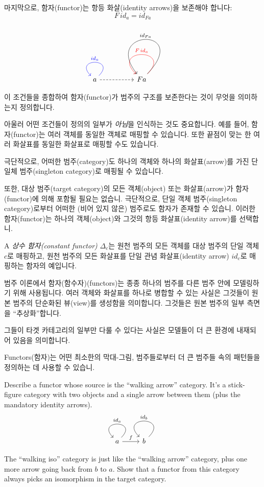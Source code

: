 \documentclass[DaoFP]{subfiles}
\begin{document}
마지막으로, 함자(functor)는 항등 화살(identity arrows)을 보존해야 합니다:
\[ F\, id_a = id_{F a} \]

\[
 \begin{tikzcd}
 a 
  \arrow[loop, blue,  "id_a"']
\arrow[rr, dashed]
 && F a
  \arrow[loop, red, "F \, id_{a}"']
  \arrow[loop, controls={+(2.5, 2.6) and +(-2, 2.5)}, "id_{F a}"']
  \end{tikzcd}
\]

이 조건들을 종합하여 함자(functor)가 범주의 구조를 보존한다는 것이 무엇을 의미하는지 정의합니다.

아울러 어떤 조건들이 정의의 일부가 \emph{아님}을 인식하는 것도 중요합니다. 예를 들어, 함자(functor)는 여러 객체를 동일한 객체로 매핑할 수 있습니다. 또한 끝점이 맞는 한 여러 화살표를 동일한 화살표로 매핑할 수도 있습니다.

극단적으로, 어떠한 범주(category)도 하나의 객체와 하나의 화살표(arrow)를 가진 단일체 범주(singleton category)로 매핑될 수 있습니다.

또한, 대상 범주(target category)의 모든 객체(object) 또는 화살표(arrow)가 함자(functor)에 의해 포함될 필요는 없습니. 극단적으로, 단일 객체 범주(singleton category)로부터 어떠한 (비어 있지 않은) 범주로도 함자가 존재할 수 있습니. 이러한 함자(functor)는 하나의 객체(object)와 그것의 항등 화살표(identity arrow)를 선택합니.

A \emph{상수 함자(constant functor)} $\Delta_c$는 원천 범주의 모든 객체를 대상 범주의 단일 객체 $c$로 매핑하고, 원천 범주의 모든 화살표를 단일 관념 화살표(identity arrow) $id_c$로 매핑하는 함자의 예입니다.

범주 이론에서 함자(함수자)(functors)는 종종 하나의 범주를 다른 범주 안에 모델링하기 위해 사용됩니다. 여러 객체와 화살표를 하나로 병합할 수 있는 사실은 그것들이 원본 범주의 단순화된 뷰(view)를 생성함을 의미합니다. 그것들은 원본 범주의 일부 측면을 ``추상화''합니다.

그들이 타겟 카테고리의 일부만 다룰 수 있다는 사실은 모델들이 더 큰 환경에 내재되어 있음을 의미합니다.

Functors(함자)는 어떤 최소한의 막대-그림, 범주들로부터 더 큰 범주들 속의 패턴들을 정의하는 데 사용할 수 있습니.

\begin{exercise}
Describe a functor whose source is the ``walking arrow'' category. It's a stick-figure category with two objects and a single arrow between them (plus the mandatory identity arrows).
\[
 \begin{tikzcd}
 a 
  \arrow[loop,  "id_{a}"']
\arrow[r, "f"]
 & b
  \arrow[loop, "id_{b}"']
  \end{tikzcd}
\]
\end{exercise}
\begin{exercise}
The ``walking iso'' category is just like the ``walking arrow'' category, plus one more arrow going back from $b$ to $a$. Show that a functor from this category always picks an isomorphism in the target category. 
\end{exercise}
\end{document}
